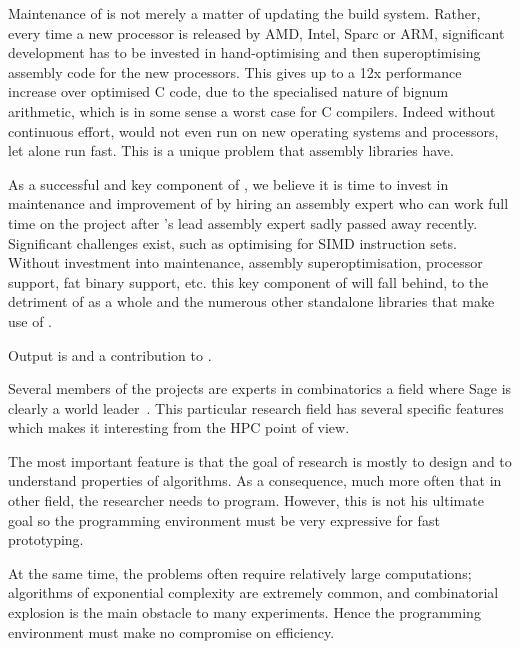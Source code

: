 \begin{workpackage}
\begin{tasklist}
\begin{task}[title=\MPIR,id=hpc-mpir, lead=UK,PM=13,wphases=6-18]
Maintenance of \MPIR is not merely a matter of updating the build system.
Rather, every time a new processor is released by AMD, Intel, Sparc or ARM,
significant development has to be invested in hand-optimising and then
superoptimising assembly code for the new processors. This gives up to a 12x
performance increase over optimised C code, due to the specialised nature of
bignum arithmetic, which is in some sense a worst case for C compilers. Indeed
without continuous effort, \MPIR would not even run on new operating systems and
processors, let alone run fast. This is a unique problem that assembly libraries
have.

As a successful and key component of \Sage, we believe it is time to invest in
maintenance and improvement of \MPIR by hiring an assembly expert who can work
full time on the project after \MPIR's lead assembly expert sadly passed
away recently. Significant challenges exist, such as
optimising for SIMD instruction sets. Without investment into maintenance,
assembly superoptimisation, processor support, fat binary support, etc. this key
component of \Sage will fall behind, to the detriment of \Sage as a whole and the
numerous other standalone libraries that make use of \MPIR.

Output is  and a contribution to .
\end{task}

\begin{task}[title=HPC infrastructure for combinatorics,id=hpc-combi,PM=26,lead=PS,partners={UB},wphases={0-6!0.3,12-36!0.5}]

  Several members of the projects are experts in combinatorics a field where
  Sage is clearly a world leader~\cite{Sage-Combinat}. This particular research
  field has several specific features which makes it interesting from the HPC
  point of view.

  The most important feature is that the goal of research is mostly to
  design and to understand properties of algorithms. As a consequence,
  much more often that in other field, the researcher needs to
  program. However, this is not his ultimate goal so the programming
  environment must be very expressive for fast prototyping.

  At the same time, the problems often require relatively large
  computations; algorithms of exponential complexity are extremely
  common, and combinatorial explosion is the main obstacle to many
  experiments. Hence the programming environment must make no
  compromise on efficiency.


\end{task}
\end{tasklist}
\end{workpackage}
